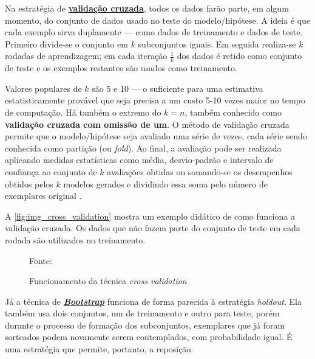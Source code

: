 Na estratégia de \textbf{\underline{validação cruzada}}, todos os dados farão parte, em algum momento, do conjunto de dados usado no teste do modelo/hipótese. A ideia é que cada exemplo sirva duplamente --- como dados de treinamento e dados de teste. Primeiro divide-se o conjunto em $k$ subconjuntos iguais. Em seguida realiza-se $k$ rodadas de aprendizagem; em cada iteração $\frac{1}{k}$ dos dados é retido como conjunto de teste e os exemplos restantes são usados como treinamento. 

Valores populares de $k$ são 5 e 10 --- o suficiente para uma estimativa estatisticamente provável que seja precisa a um custo 5-10 vezes maior no tempo de computação. Há também o extremo do $k = n$, também conhecido como \textbf{validação cruzada com omissão de um}. O método de validação cruzada permite que o modelo/hipótese seja avaliado uma série de vezes, cada série sendo conhecida como partição (ou \textit{fold}). Ao final, a avaliação pode ser realizada aplicando medidas estatísticas como média, desvio-padrão e intervalo de confiança ao conjunto de $k$ avaliações obtidas ou somando-se os desempenhos obtidos pelos $k$ modelos gerados e dividindo essa soma pelo número de exemplares original \cite{Norvig2013}\cite{Boscarioli2017}\cite{ferrari2017} \cite{aprenda_mineracao_fernando_amaral16}.

A \autoref{fig:img_cross_validation} mostra um exemplo didático de como funciona a validação cruzada. Os dados que não fazem parte do conjunto de teste em cada rodada são utilizados no treinamento.

\begin{figure}[h!]
	\centering
	\caption{Funcionamento da técnica \textit{cross validation}}
	
	{\scriptsize Fonte: \cite{fold_cross_validation:k-fold_nodate}}
	\label{fig:img_cross_validation}
\end{figure}

Já a técnica de \textit{\textbf{\underline{Bootstrap}}} funciona de forma  parecida à estratégia \textit{holdout}. Ela também usa dois conjuntos, um de treinamento e outro para teste, porém durante o processo de formação dos subconjuntos, exemplares que já foram sorteados podem novamente serem contemplados, com probabilidade igual. É uma estratégia que permite, portanto, a reposição.

